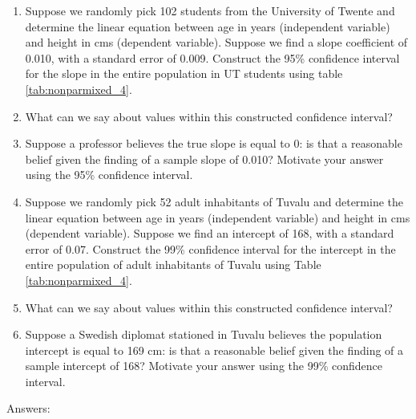 \documentclass[]{report}\usepackage[]{graphicx}\usepackage[]{color}
\begin{document}
\begin{enumerate}


\item Suppose we randomly pick 102 students from the University of Twente and determine the linear equation between age in years (independent variable) and height in cms (dependent variable). Suppose we find a slope coefficient of 0.010, with a standard error of 0.009. Construct the 95\% confidence interval for the slope in the entire population in UT students using table \ref{tab:nonparmixed_4}.

\item What can we say about values within this constructed confidence interval?

\item Suppose a professor believes the true slope is equal to 0: is that a reasonable belief given the finding of a sample slope of 0.010? Motivate your answer using the 95\% confidence interval.


\item Suppose we randomly pick 52 adult inhabitants of Tuvalu and determine the linear equation between age in years (independent variable) and height in cms (dependent variable). Suppose we find an intercept of 168, with a standard error of 0.07. Construct the 99\% confidence interval for the intercept in the entire population of adult inhabitants of Tuvalu using Table \ref{tab:nonparmixed_4}.

\item What can we say about values within this constructed confidence interval?

\item Suppose a Swedish diplomat stationed in Tuvalu believes the population intercept is equal to 169 cm: is that a reasonable belief given the finding of a sample intercept of 168? Motivate your answer using the 99\% confidence interval.

\end{enumerate}


Answers:
\end{document}
